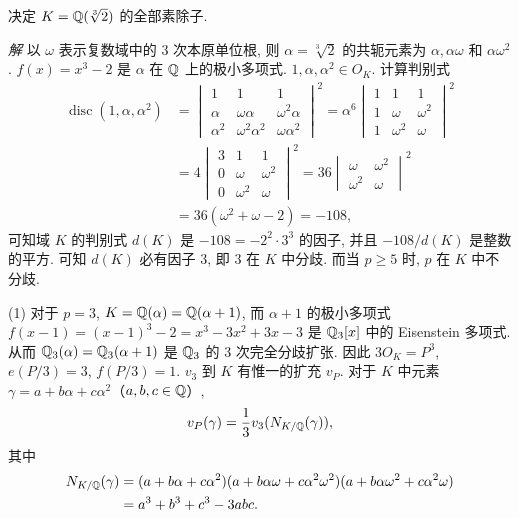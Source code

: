 \begin{example}
决定 $K=\mathbb{Q}(\sqrt[3]{2})$ 的全部素除子.

\emph{解} 以 $\omega$ 表示复数域中的 $3$ 次本原单位根, 则 $\alpha=\sqrt[3]{2}$ 的共轭元素为 $\alpha,\alpha\omega$ 和 $\alpha\omega^2$. $f(x)=x^3-2$ 是 $\alpha$ 在 $\mathbb{Q}$ 上的极小多项式. $1,\alpha,\alpha^2\in O_K$. 计算判别式
\begin{align*}
  \operatorname{disc}(1,\alpha,\alpha^2)&=
  \begin{vmatrix}
    1 & 1 & 1\\
    \alpha & \omega\alpha & \omega^2\alpha\\
    \alpha^2 & \omega^2\alpha^2 & \omega\alpha^2
  \end{vmatrix}^2
  =\alpha^6
  \begin{vmatrix}
    1 & 1 & 1\\
    1 & \omega & \omega^2\\
    1 & \omega^2 & \omega
  \end{vmatrix}^2\\
  &=4
  \begin{vmatrix}
    3 & 1 & 1\\
    0 & \omega & \omega^2\\
    0 & \omega^2 & \omega
  \end{vmatrix}^2
  =36
  \begin{vmatrix}
    \omega & \omega^2\\
    \omega^2 & \omega
  \end{vmatrix}^2\\
  &=36(\omega^2+\omega-2)=-108,
\end{align*}
可知域 $K$ 的判别式 $d(K)$ 是 $-108=-2^2\cdot 3^3$ 的因子, 并且 $-108/d(K)$ 是整数的平方. 可知 $d(K)$ 必有因子 $3$, 即 $3$ 在 $K$ 中分歧. 而当 $p\geqslant 5$ 时, $p$ 在 $K$ 中不分歧.

(1) 对于 $p=3$, $K=\mathbb{Q}(\alpha)=\mathbb{Q}(\alpha+1)$, 而 $\alpha+1$ 的极小多项式 $f(x-1)=(x-1)^3-2=x^3-3x^2+3x-3$ 是 $\mathbb{Q}_3[x]$ 中的 Eisenstein 多项式. 从而 $\mathbb{Q}_3(\alpha)=\mathbb{Q}_3(\alpha+1)$ 是 $\mathbb{Q}_3$ 的 $3$ 次完全分歧扩张. 因此 $3O_K=P^3$, $e(P/3)=3$, $f(P/3)=1$. $v_3$ 到 $K$ 有惟一的扩充 $v_P$. 对于 $K$ 中元素 $\gamma=a+b\alpha+c\alpha^2$（$a,b,c\in\mathbb{Q}$）,
\[
  v_P(\gamma)=\frac{1}{3}v_3(N_{K/\mathbb{Q}}(\gamma)),
\]
其中
\begin{align*}
  N_{K/\mathbb{Q}}(\gamma)&=(a+b\alpha+c\alpha^2)(a+b\alpha\omega+c\alpha^2\omega^2)(a+b\alpha\omega^2+c\alpha^2\omega)\\
  &=a^3+b^3+c^3-3abc.
\end{align*}


\end{example}
